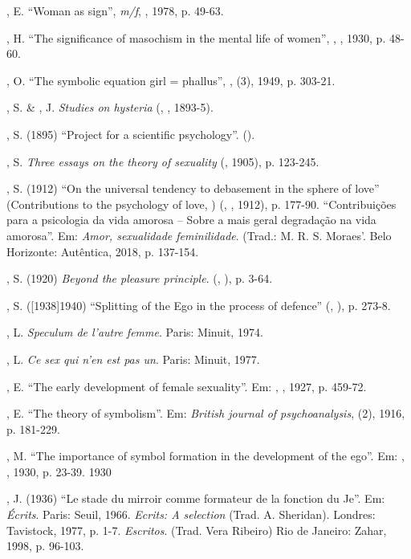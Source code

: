, E. ``Woman as sign'', \emph{m/f}, , 1978, p. 49-63.

, H. ``The significance of masochism in the mental life of women'',
\emph{}, , 1930, p. 48-60.

, O. ``The symbolic equation girl = phallus'', \emph{}, 
(3), 1949, p. 303-21.

, S. \& , J. \emph{Studies on hysteria} (, , 1893-5).

, S. (1895) ``Project for a scientific psychology''. ().

, S. \emph{Three essays on the theory of sexuality} (,
1905), p. 123-245.

, S. (1912) ``On the universal tendency to debasement in the sphere
of love'' (Contributions to the psychology of love, ) (, , 1912),
p. 177-90. ``Contribuições para a psicologia da vida amorosa -- Sobre a
mais geral degradação na vida amorosa''. Em: \emph{Amor, sexualidade
feminilidade}. (Trad.: M. R. S. Moraes'. Belo Horizonte: Autêntica,
2018, p. 137-154.

, S. (1920) \emph{Beyond the pleasure principle}. (, ), p.
3-64.

, S. ({[}1938{]}1940) ``Splitting of the Ego in the process of
defence'' (, ), p. 273-8.

, L. \emph{Speculum de l'autre femme}. Paris: Minuit, 1974.

, L. \emph{Ce sex qui n'en est pas un}. Paris: Minuit, 1977.

, E. ``The early development of female sexuality''. Em:
\emph{}, , 1927, p. 459-72.

, E. ``The theory of symbolism''. Em: \emph{British journal of
psychoanalysis},  (2), 1916, p. 181-229.

, M. ``The importance of symbol formation in the development of the
ego''. Em: \emph{}, , 1930, p. 23-39. 1930

, J. (1936) ``Le stade du mirroir comme formateur de la fonction du
Je''. Em: \emph{Écrits}. Paris: Seuil, 1966. \emph{Ecrits: A
selection} (Trad. A. Sheridan). Londres: Tavistock, 1977, p. 1-7.
\emph{Escritos}. (Trad. Vera Ribeiro) Rio de Janeiro: Zahar, 1998,
p. 96-103.

